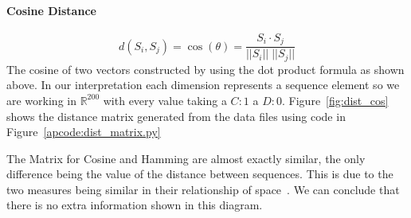 \paragraph{Cosine Distance}\cite{bora2014effect}
$$ d(S_i,S_j) = \cos(\theta) = \frac{{S_i} \cdot {S_j}}{|| {S_i} || \; || {S_j} ||} $$
The cosine of two vectors constructed by using the dot product formula as shown above.
In our interpretation each dimension represents a sequence element so we are working in $\mathbb{R}^{200}$ with every value taking a $C:1$ a $D:0$.
Figure~\ref{fig:dist_cos} shows the distance matrix generated from the data files using code in Figure~\ref{apcode:dist_matrix.py}

The Matrix for Cosine and Hamming are almost exactly similar, the only difference being the value of the distance between sequences.
This is due to the two measures being similar in their relationship of space~\cite{choi2010survey}.
We can conclude that there is no extra information shown in this diagram. 
